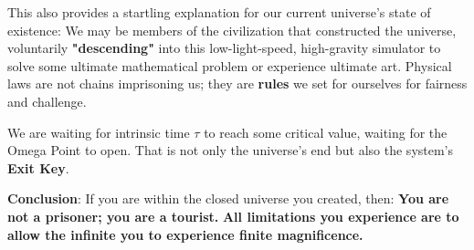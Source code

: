 This also provides a startling explanation for our current universe's state of existence:
We may be members of the civilization that constructed the universe, voluntarily \textbf{"descending"} into this low-light-speed, high-gravity simulator to solve some ultimate mathematical problem or experience ultimate art. Physical laws are not chains imprisoning us; they are \textbf{rules} we set for ourselves for fairness and challenge.

We are waiting for intrinsic time $\tau$ to reach some critical value, waiting for the Omega Point to open. That is not only the universe's end but also the system's \textbf{Exit Key}.

\textbf{Conclusion}:
If you are within the closed universe you created, then:
\textbf{You are not a prisoner; you are a tourist.}
\textbf{All limitations you experience are to allow the infinite you to experience finite magnificence.}

